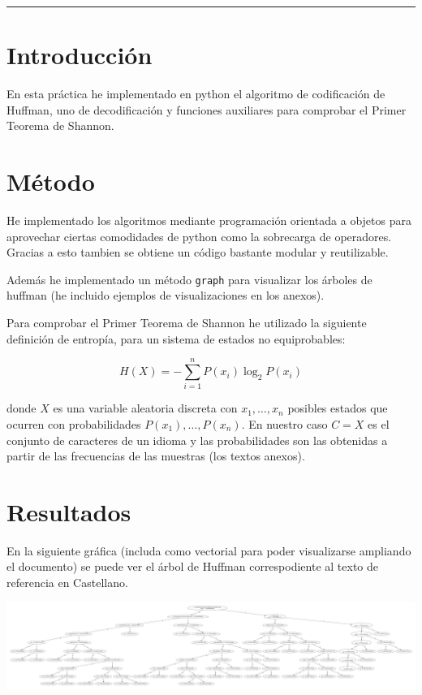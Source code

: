 \documentclass[10pt, spanish]{article}
\theoremstyle{definition}
\theoremstyle{break}
\begin{document}
 \noindent\rule{17cm}{1pt}

\section{Introducción}

En esta práctica he implementado en python el algoritmo de codificación de
Huffman, uno de decodificación y funciones auxiliares para comprobar el Primer
Teorema de Shannon.

\section{Método}

He implementado los algoritmos mediante programación orientada a objetos para
aprovechar ciertas comodidades de python como la sobrecarga de operadores.
Gracias a esto tambien se obtiene un código bastante modular y reutilizable.


Además he implementado un método \texttt{graph} para visualizar los árboles de
huffman (he incluido ejemplos de visualizaciones en los anexos).

Para comprobar el Primer Teorema de Shannon he utilizado la siguiente definición
de entropía, para un sistema de estados no equiprobables:

\[ H(X) =-\sum_{i=1}^{n}P(x_i) \log_2{P(x_i)} \] 

donde $X$ es una variable aleatoria discreta con $x_1,\ldots,x_n$ posibles
estados que ocurren con probabilidades $P(x_1),\ldots,P(x_n)$. En nuestro caso
$C=X$ es el conjunto de caracteres de un idioma y las probabilidades son las
obtenidas a partir de las frecuencias de las muestras (los textos anexos).

\section{Resultados}
En la siguiente gráfica (includa como vectorial para poder visualizarse
ampliando el documento) se puede ver el árbol de Huffman correspodiente al texto
de referencia en Castellano.

\begin{center}
    \includegraphics[scale=0.1]{./arbol_es.pdf}
\end{center}
\end{document}
